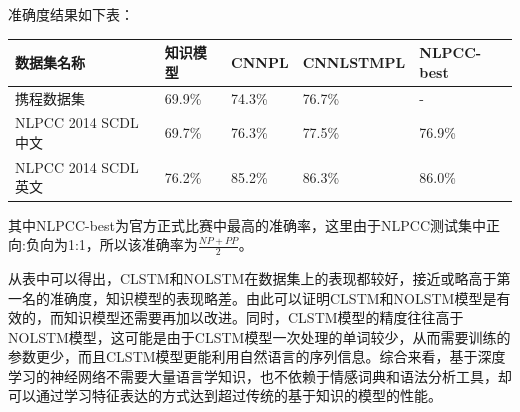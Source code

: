 准确度结果如下表：
\begin{center}
\begin{longtabu} to \textwidth{X|X|X|X|X}
\hline
数据集名称 & 知识模型 & CNNPL & CNNLSTMPL & NLPCC-best
\\\hline
携程数据集 & 69.9\% & 74.3\% & 76.7\% & -
\\\hline
NLPCC 2014 SCDL 中文 & 69.7\% & 76.3\% & 77.5\% & 76.9\%
\\\hline
NLPCC 2014 SCDL 英文 & 76.2\% & 85.2\% & 86.3\% & 86.0\%
\\\hline
\end{longtabu}
\end{center}


其中NLPCC-best为官方正式比赛中最高的准确率\cite{nlpccres}，这里由于NLPCC测试集中正向:负向为1:1，所以该准确率为$\frac{NP + PP}{2}$。\par
从表中可以得出，CLSTM和NOLSTM在数据集上的表现都较好，接近或略高于第一名的准确度，知识模型的表现略差。由此可以证明CLSTM和NOLSTM模型是有效的，而知识模型还需要再加以改进。同时，CLSTM模型的精度往往高于NOLSTM模型，这可能是由于CLSTM模型一次处理的单词较少，从而需要训练的参数更少，而且CLSTM模型更能利用自然语言的序列信息。综合来看，基于深度学习的神经网络不需要大量语言学知识，也不依赖于情感词典和语法分析工具，却可以通过学习特征表达的方式达到超过传统的基于知识的模型的性能。\par

